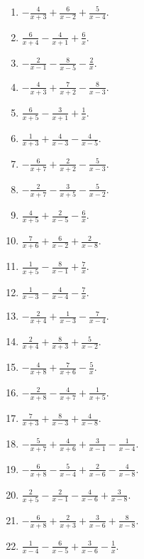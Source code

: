 \documentclass[11pt,oneside]{book}
\begin{document}
\begin{enumerate}[leftmargin=*,label=\textbf{R\arabic*.},itemsep=0.45\baselineskip]
\item $\displaystyle - \frac{4}{x + 3} + \frac{6}{x - 2} + \frac{5}{x - 4}$.
\item $\displaystyle \frac{6}{x + 4} - \frac{4}{x + 1} + \frac{6}{x}$.
\item $\displaystyle - \frac{2}{x - 1} - \frac{8}{x - 5} - \frac{2}{x}$.
\item $\displaystyle - \frac{4}{x + 3} + \frac{7}{x + 2} - \frac{8}{x - 3}$.
\item $\displaystyle \frac{6}{x + 5} - \frac{3}{x + 1} + \frac{1}{x}$.
\item $\displaystyle \frac{1}{x + 3} + \frac{4}{x - 3} - \frac{4}{x - 5}$.
\item $\displaystyle - \frac{6}{x + 7} + \frac{2}{x + 2} - \frac{5}{x - 3}$.
\item $\displaystyle - \frac{2}{x + 7} - \frac{3}{x + 5} - \frac{5}{x - 2}$.
\item $\displaystyle \frac{4}{x + 5} + \frac{2}{x - 5} - \frac{6}{x}$.
\item $\displaystyle \frac{7}{x + 6} + \frac{6}{x - 2} + \frac{2}{x - 8}$.
\item $\displaystyle \frac{1}{x + 5} - \frac{8}{x - 1} + \frac{7}{x}$.
\item $\displaystyle \frac{1}{x - 3} - \frac{4}{x - 4} - \frac{7}{x}$.
\item $\displaystyle - \frac{2}{x + 4} + \frac{1}{x - 3} - \frac{7}{x - 4}$.
\item $\displaystyle \frac{2}{x + 4} + \frac{8}{x + 3} + \frac{5}{x - 2}$.
\item $\displaystyle - \frac{4}{x + 8} + \frac{7}{x + 6} - \frac{5}{x}$.
\item $\displaystyle - \frac{2}{x + 8} - \frac{4}{x + 7} + \frac{1}{x + 5}$.
\item $\displaystyle \frac{7}{x + 3} + \frac{8}{x - 3} + \frac{4}{x - 8}$.
\item $\displaystyle - \frac{5}{x + 7} + \frac{4}{x + 6} + \frac{3}{x - 1} - \frac{1}{x - 4}$.
\item $\displaystyle - \frac{6}{x + 8} - \frac{5}{x - 4} + \frac{2}{x - 6} - \frac{4}{x - 8}$.
\item $\displaystyle \frac{2}{x + 5} - \frac{2}{x - 1} - \frac{4}{x - 6} + \frac{3}{x - 8}$.
\item $\displaystyle - \frac{6}{x + 8} + \frac{2}{x + 3} + \frac{3}{x - 6} + \frac{8}{x - 8}$.
\item $\displaystyle \frac{1}{x - 4} - \frac{6}{x - 5} + \frac{3}{x - 6} - \frac{1}{x}$.

\end{enumerate}
\end{document}
